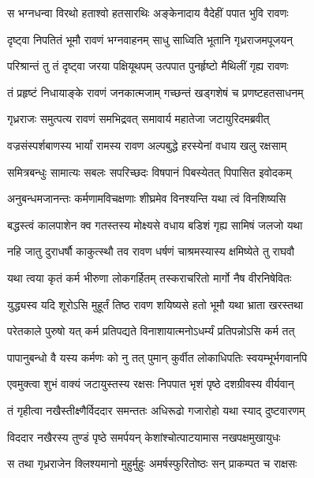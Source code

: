\twolineshloka
{स भग्नधन्वा विरथो हताश्वो हतसारथिः}
{अङ्केनादाय वैदेहीं पपात भुवि रावणः} %

\twolineshloka
{दृष्ट्वा निपतितं भूमौ रावणं भग्नवाहनम्}
{साधु साध्विति भूतानि गृध्रराजमपूजयन्} %

\twolineshloka
{परिश्रान्तं तु तं दृष्ट्वा जरया पक्षियूथपम्}
{उत्पपात पुनर्हृष्टो मैथिलीं गृह्य रावणः} %

\twolineshloka
{तं प्रहृष्टं निधायाङ्के रावणं जनकात्मजाम्}
{गच्छन्तं खड्गशेषं च प्रणष्टहतसाधनम्} %

\twolineshloka
{गृध्रराजः समुत्पत्य रावणं समभिद्रवत्}
{समावार्य महातेजा जटायुरिदमब्रवीत्} %

\twolineshloka
{वज्रसंस्पर्शबाणस्य भार्यां रामस्य रावण}
{अल्पबुद्धे हरस्येनां वधाय खलु रक्षसाम्} %

\twolineshloka
{समित्रबन्धुः सामात्यः सबलः सपरिच्छदः}
{विषपानं पिबस्येतत् पिपासित इवोदकम्} %

\twolineshloka
{अनुबन्धमजानन्तः कर्मणामविचक्षणाः}
{शीघ्रमेव विनश्यन्ति यथा त्वं विनशिष्यसि} %

\twolineshloka
{बद्धस्त्वं कालपाशेन क्व गतस्तस्य मोक्ष्यसे}
{वधाय बडिशं गृह्य सामिषं जलजो यथा} %

\twolineshloka
{नहि जातु दुराधर्षौ काकुत्स्थौ तव रावण}
{धर्षणं चाश्रमस्यास्य क्षमिष्येते तु राघवौ} %

\twolineshloka
{यथा त्वया कृतं कर्म भीरुणा लोकगर्हितम्}
{तस्कराचरितो मार्गो नैष वीरनिषेवितः} %

\twolineshloka
{युद्ध्यस्व यदि शूरोऽसि मुहूर्तं तिष्ठ रावण}
{शयिष्यसे हतो भूमौ यथा भ्राता खरस्तथा} %

\twolineshloka
{परेतकाले पुरुषो यत् कर्म प्रतिपद्यते}
{विनाशायात्मनोऽधर्म्यं प्रतिपन्नोऽसि कर्म तत्} %

\twolineshloka
{पापानुबन्धो वै यस्य कर्मणः को नु तत् पुमान्}
{कुर्वीत लोकाधिपतिः स्वयम्भूर्भगवानपि} %

\twolineshloka
{एवमुक्त्वा शुभं वाक्यं जटायुस्तस्य रक्षसः}
{निपपात भृशं पृष्ठे दशग्रीवस्य वीर्यवान्} %

\twolineshloka
{तं गृहीत्वा नखैस्तीक्ष्णैर्विददार समन्ततः}
{अधिरूढो गजारोहो यथा स्याद् दुष्टवारणम्} %

\twolineshloka
{विददार नखैरस्य तुण्डं पृष्ठे समर्पयन्}
{केशांश्चोत्पाटयामास नखपक्षमुखायुधः} %

\twolineshloka
{स तथा गृध्रराजेन क्लिश्यमानो मुहुर्मुहुः}
{अमर्षस्फुरितोष्ठः सन् प्राकम्पत च राक्षसः} %

